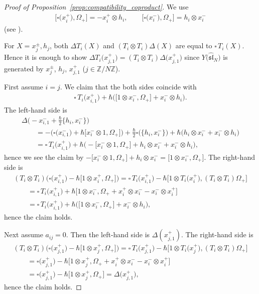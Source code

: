 \documentclass[pdftex]{sigma}
\theoremstyle{definition}
\numberwithin{equation}{section}
\newcommand{\bbZ}{\mathbb{Z}}
\newcommand{\affY}{Y\big(\affsl\big)}
\newcommand{\affsl}{\hat{\mathfrak{sl}}_N}
\begin{document}
\begin{proof}[Proof of Proposition~\ref{prop:compatibility_coproduct}]
We use
\begin{gather*}
\big[\square\big(x_i^+\big), \Omega_+\big] = -x_i^+ \otimes h_i, \qquad \big[\square\big(x_i^-\big), \Omega_+\big] = h_i \otimes x_i^-
\end{gather*}
(see \cite[Lemma~4.2]{MR3861718}).

For $X=x_j^{\pm}, h_j$, both $\Delta T_i(X)$ and $(T_i \otimes T_i) \Delta(X)$ are equal to $\square\, T_i(X)$. Hence it is enough to show $\Delta T_i\big(x_{j,1}^+\big) = (T_i \otimes T_i)\Delta\big(x_{j,1}^+\big)$ since $\affY$ is generated by $x_j^{\pm}$, $h_j$, $x_{j,1}^+$ ($j \in \bbZ/N\bbZ$).

First assume $i=j$. We claim that the both sides coincide with
\begin{gather*}
\square \, T_i\big(x_{i,1}^+\big) +\hbar \big(\big[1 \otimes x_i^-, \Omega_+\big] + x_i^- \otimes h_i \big).
\end{gather*}
The left-hand side is
\begin{gather*}
\Delta\big({-}x_{i,1}^- + \tfrac{\hbar}{2}\big\{h_i,x_i^-\big\}\big) \\
\qquad{} = -\big(\square\big(x_{i,1}^-\big) + \hbar\big[x_i^- \otimes 1,\Omega_+\big]\big) + \tfrac{\hbar}{2} \square\big(\big\{h_i,x_i^-\big\}\big) + \hbar\big(h_i \otimes x_i^- + x_i^- \otimes h_i\big) \\
\qquad{} = \square\,T_i\big(x_{i,1}^+\big) + \hbar \big({-}\big[x_i^- \otimes 1,\Omega_+\big] + h_i \otimes x_i^- + x_i^- \otimes h_i \big),
\end{gather*}
hence we see the claim by $-\big[x_i^- \otimes 1,\Omega_+\big] + h_i \otimes x_i^- = \big[1 \otimes x_i^-,\Omega_+\big]$. The right-hand side is
\begin{gather*}
(T_i \otimes T_i)\big(\square\big(x_{i,1}^+\big)-\hbar\big[1 \otimes x_i^+,\Omega_+\big]\big) = \square\,T_i\big(x_{i,1}^+\big) - \hbar\big[1 \otimes T_i\big(x_i^+\big), (T_i \otimes T_i)\Omega_+\big]\\
\qquad {} = \square\,T_i\big(x_{i,1}^+\big) + \hbar\big[1 \otimes x_i^-, \Omega_+ + x_i^+ \otimes x_i^- - x_i^- \otimes x_i^+\big]\\
\qquad {} = \square\,T_i\big(x_{i,1}^+\big) + \hbar \big(\big[1 \otimes x_i^-, \Omega_+\big] + x_i^- \otimes h_i\big),
\end{gather*}
hence the claim holds.

Next assume $a_{ij}=0$. Then the left-hand side is $\Delta(x_{j,1}^+)$. The right-hand side is
\begin{gather*}
(T_i \otimes T_i)\big(\square\big(x_{j,1}^+\big)-\hbar\big[1 \otimes x_j^+,\Omega_+\big]\big) = \square\, T_i\big(x_{j,1}^+\big) - \hbar\big[1 \otimes T_i\big(x_j^+\big), (T_i \otimes T_i)\Omega_+\big]\\
\qquad{} = \square\big(x_{j,1}^+\big) - \hbar\big[1 \otimes x_j^+, \Omega_+ + x_i^+ \otimes x_i^- - x_i^- \otimes x_i^+\big]\\
\qquad{} = \square\big(x_{j,1}^+\big) - \hbar\big[1 \otimes x_j^+, \Omega_+\big] = \Delta\big(x_{j,1}^+\big),
\end{gather*}
hence the claim holds.


\end{proof}
\end{document}
